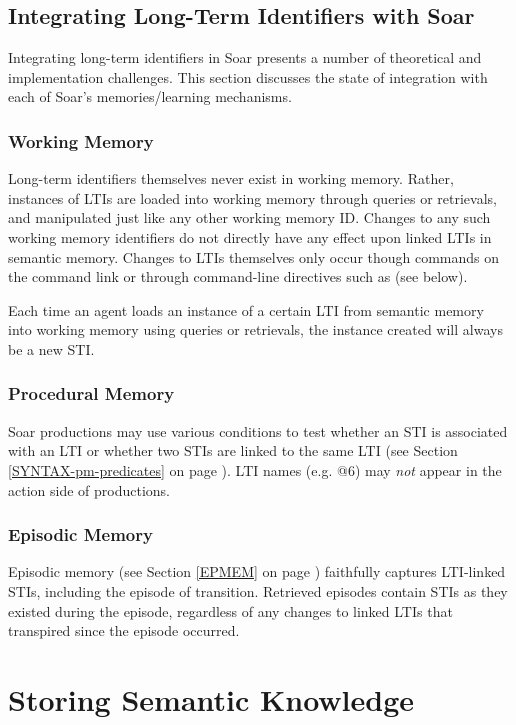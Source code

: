 \subsection{Integrating Long-Term Identifiers with Soar}
Integrating long-term identifiers in Soar presents a number of theoretical and implementation challenges.  
This section discusses the state of integration with each of Soar's memories/learning mechanisms.

\subsubsection{Working Memory}
Long-term identifiers themselves never exist in working memory. Rather, instances of LTIs are loaded into working memory through queries or retrievals, and manipulated just like any other working memory ID. Changes to any such working memory identifiers do not directly have any effect upon linked LTIs in semantic memory. Changes to LTIs themselves only occur though  commands on the command link  or through command-line directives such as  (see below).

Each time an agent loads an instance of a certain LTI from semantic memory into working memory using queries or retrievals, the instance created will always be a new STI.

\subsubsection{Procedural Memory}
Soar productions may use various conditions to test whether an STI is associated with an LTI or whether two STIs are linked to the same LTI (see Section \ref{SYNTAX-pm-predicates} on page \pageref{SYNTAX-pm-predicates}).
LTI names (e.g. {@}6) may \emph{not} appear in the action side of productions.

\subsubsection{Episodic Memory}
Episodic memory (see Section \ref{EPMEM} on page \pageref{EPMEM}) faithfully captures LTI-linked STIs, including the episode of transition. 
Retrieved episodes contain STIs as they existed during the episode, regardless of any changes to linked LTIs that transpired since the episode occurred.

\section{Storing Semantic Knowledge}
\label{SMEM-store}

